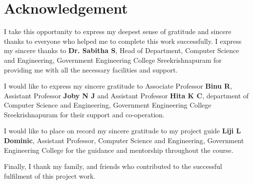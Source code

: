 \chapter*{Acknowledgement}%
%



\par I take this opportunity to express my deepest sense of gratitude and sincere thanks to everyone who helped me to complete this work successfully. I express my sincere thanks to \textbf{Dr. Sabitha S}, Head of Department, Computer Science and Engineering, Government Engineering College Sreekrishnapuram for providing me with all the necessary facilities and support.\par

I would like to express my sincere gratitude to Associate Professor \textbf{Binu R}, Assistant Professor \textbf{Joby N J} and Assistant Professor \textbf{Hita K C}, department of Computer Science and Engineering, Government Engineering College Sreekrishnapuram for their support and co-operation.

I would like to place on record my sincere gratitude to my project guide \textbf{Liji L Dominic}, Assistant Professor, Computer Science and Engineering, Government Engineering College for the guidance and mentorship throughout the course.

Finally, I thank my family, and friends who contributed to the successful fulfilment of this project work.

\vspace*{30pt}
\begin{flushright}
	\textbf{\studentA}
\end{flushright}
\thispagestyle{plain}
